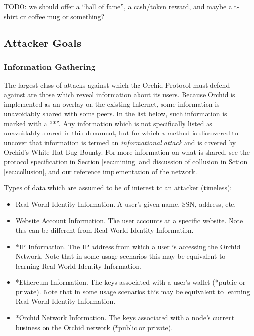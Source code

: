\documentclass{article}
\newcommand{\orchid}{Orchid}
\newcommand{\Orchid}{\orchid}
\begin{document}
TODO: we should offer a “hall of fame”, a cash/token reward, and maybe a t-shirt or coffee mug or something?


\subsection{Attacker Goals}

\subsubsection{Information Gathering}

The largest class of attacks against which the \Orchid{} Protocol must defend against are those which reveal information about its users. Because \Orchid{} is implemented as an overlay on the existing Internet, some information is unavoidably shared with some peers. In the list below, such information is marked with a “*”. Any information which is not specifically listed as unavoidably shared in this document, but for which a method is discovered to uncover that information is termed an \emph{informational attack} and is covered by \Orchid’s White Hat Bug Bounty. For more information on what is shared, see the protocol specification in Section \ref{sec:mining} and discussion of collusion in Sction \ref{sec:collusion}, and our reference implementation of the network\cite{oursoftware}.

Types of data which are assumed to be of interest to an attacker (timeless):

\begin{itemize}
\item Real-World Identity Information. A user’s given name, SSN, address, etc.
\item Website Account Information. The user accounts at a specific website. Note this can be different from Real-World Identity Information.
\item *IP Information. The IP address from which a user is accessing the \Orchid{} Network. Note that in some usage scenarios this may be equivalent to learning Real-World Identity Information.
\item *Ethereum Information. The keys associated with a user’s wallet (*public or private). Note that in some usage scenarios this may be equivalent to learning Real-World Identity Information.
\item *\Orchid{} Network Information. The keys associated with a node’s current business on the \Orchid{} network (*public or private).
\end{itemize}
\end{document}
